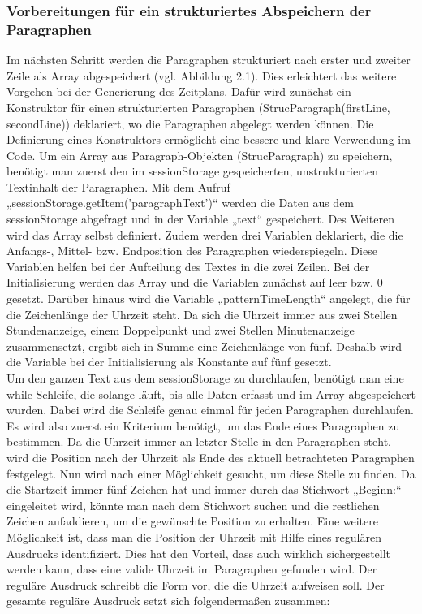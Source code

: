 \subsubsection{Vorbereitungen für ein strukturiertes Abspeichern der Paragraphen}
Im nächsten Schritt werden die Paragraphen strukturiert nach erster und zweiter Zeile als Array abgespeichert (vgl. Abbildung 2.1). Dies erleichtert das weitere Vorgehen bei der Generierung des Zeitplans. Dafür wird zunächst ein Konstruktor für einen strukturierten Paragraphen (StrucParagraph(firstLine, secondLine)) deklariert, wo die Paragraphen abgelegt werden können. Die Definierung eines Konstruktors ermöglicht eine bessere und klare Verwendung im Code. Um ein Array aus Paragraph-Objekten (StrucParagraph) zu speichern, benötigt man zuerst den im sessionStorage gespeicherten, unstrukturierten Textinhalt der Paragraphen. Mit dem Aufruf „sessionStorage.getItem('paragraphText')“ werden die Daten aus dem sessionStorage abgefragt und in der Variable „text“ gespeichert. Des Weiteren wird das Array selbst definiert. Zudem werden drei Variablen deklariert, die die Anfangs-, Mittel- bzw. Endposition des Paragraphen wiederspiegeln. Diese Variablen helfen bei der Aufteilung des Textes in die zwei Zeilen. Bei der Initialisierung werden das Array und die Variablen zunächst auf leer bzw. 0 gesetzt. Darüber hinaus wird die Variable „patternTimeLength“ angelegt, die für die Zeichenlänge der Uhrzeit steht. Da sich die Uhrzeit immer aus zwei Stellen Stundenanzeige, einem Doppelpunkt und zwei Stellen Minutenanzeige zusammensetzt, ergibt sich in Summe eine Zeichenlänge von fünf. Deshalb wird die Variable bei der Initialisierung als Konstante auf fünf gesetzt.\\
Um den ganzen Text aus dem sessionStorage zu durchlaufen, benötigt man eine while-Schleife, die solange läuft, bis alle Daten erfasst und im Array abgespeichert wurden. Dabei wird die Schleife genau einmal für jeden Paragraphen durchlaufen. Es wird also zuerst ein Kriterium benötigt, um das Ende eines Paragraphen zu bestimmen. Da die Uhrzeit immer an letzter Stelle in den Paragraphen steht, wird die Position nach der Uhrzeit als Ende des aktuell betrachteten Paragraphen festgelegt. Nun wird nach einer Möglichkeit gesucht, um diese Stelle zu finden. Da die Startzeit immer fünf Zeichen hat und immer durch das Stichwort „Beginn:“ eingeleitet wird, könnte man nach dem Stichwort suchen und die restlichen Zeichen aufaddieren, um die gewünschte Position zu erhalten. Eine weitere Möglichkeit ist, dass man die Position der Uhrzeit mit Hilfe eines regulären Ausdrucks identifiziert. Dies hat den Vorteil, dass auch wirklich sichergestellt werden kann, dass eine valide Uhrzeit im Paragraphen gefunden wird. Der reguläre Ausdruck schreibt die Form vor, die die Uhrzeit aufweisen soll. Der gesamte reguläre Ausdruck setzt sich folgendermaßen zusammen:
